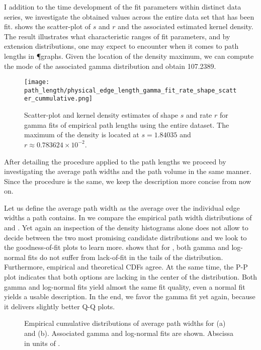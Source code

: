 		I addition to the time development of the fit parameters within distinct data series, we investigate the obtained values across the entire data set that has been fit.  shows the scatter-plot of $s$ and $r$ and the associated estimated kernel density. The result illustrates what characteristic ranges of fit parameters, and by extension distributions, one may expect to encounter when it comes to path lengths in \P graphs. Given the location of the density maximum, we can compute the mode of the associated gamma distribution and obtain \SI{107.2389}{\pixel}.

		\begin{figure}[!htbp]
			\centering
				\texttt{[image: path\_length/physical\_edge\_length\_gamma\_fit\_rate\_shape\_scatter\_cummulative.png]}
			\caption[Path length distribution - Fit parameter densities]{Scatter-plot and kernel density estimates of shape $s$ and rate $r$ for gamma fits of empirical path lengths using the entire dataset. The maximum of the density is located at $s = 1.84035$ and $r \approx 0.783624 \times 10^{-2}$.}
			\label{fig:path_lengths_gamma_fit_kde}
		\end{figure}

		After detailing the procedure applied to the path lengths we proceed by investigating the average path widths and the path volume in the same manner. Since the procedure is the same, we keep the description more concise from now on.

		Let us define the average path width as the average over the individual edge widths a path contains. In  we compare the empirical path width distributions of  and . Yet again an inspection of the density histograms alone does not allow to decide between the two most promising candidate distributions and we look to the goodness-of-fit plots to learn more.  shows that for , both gamma and log-normal fits do not suffer from lack-of-fit in the tails of the distribution. Furthermore, empirical and theoretical CDFs agree. At the same time, the P-P plot indicates that both options are lacking in the center of the distribution. Both gamma and log-normal fits yield almost the same fit quality, even a normal fit yields a usable description. In the end, we favor the gamma fit yet again, because it delivers slightly better Q-Q plots. 

		\begin{figure}
			\centering
			\qquad

			\caption[Path width distribution]{Empirical cumulative distributions of average path widths for  (a) and  (b). Associated gamma and log-normal fits are shown. Abscissa in units of \si{\pixel}.}
			\label{fig:path_widths}
		\end{figure}

